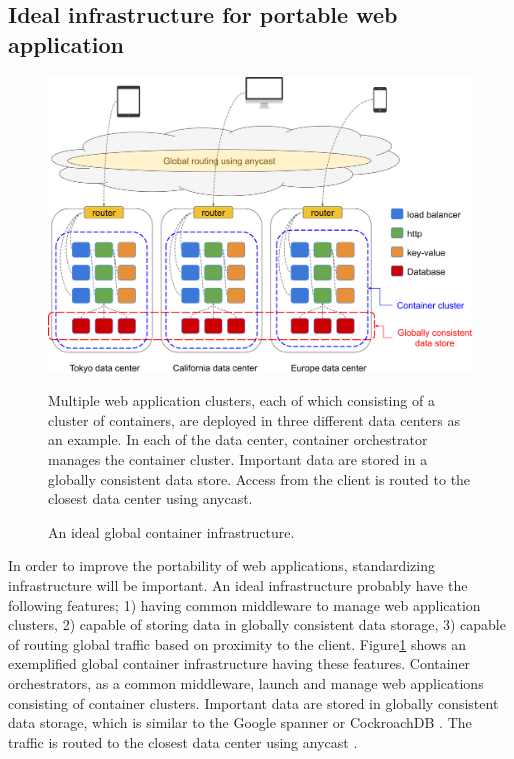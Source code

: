 \subsection{Ideal infrastructure for portable web application}

\begin{figure}[h]
\begin{center}
\includegraphics[width=0.9\columnwidth]{Figs/global_container_infrastructure}
\end{center}
\caption{
An ideal global container infrastructure.
}
\centering\parbox[c]{0.9\columnwidth}{
Multiple web application clusters, each of which consisting of a cluster of containers, are deployed in three different data centers as an example.
In each of the data center, container orchestrator manages the container cluster.
Important data are stored in a globally consistent data store.
Access from the client is routed to the closest data center using anycast.
}
\label{fig:global_container_infrastructure}
\end{figure}


In order to improve the portability of web applications, standardizing infrastructure will be important.
An ideal infrastructure probably have the following features;
1) having common middleware to manage web application clusters,
2) capable of storing data in globally consistent data storage,
3) capable of routing global traffic based on proximity to the client.
%
Figure\ref{fig:global_container_infrastructure} shows an exemplified global container infrastructure having these features.
Container orchestrators, as a common middleware, launch and manage web applications consisting of container clusters.
Important data are stored in globally consistent data storage, which is similar to the Google spanner \cite{Corbett:2013:SGG:2518037.2491245,Cooper:2013:SGG:2485732.2485756} or CockroachDB \cite{pavlo2016s}.
The traffic is routed to the closest data center using anycast \cite{rfc1546,weiden2010anycast}.

